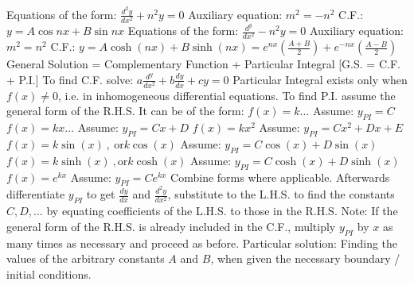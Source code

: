 \documentclass[12pt]{article}
\begin{document}
\begin{flushleft}
	\textbullet \quad Equations of the form: $\displaystyle \frac{d^2y}{dx^2} +n^2y = 0$ \linebreak 
	Auxiliary equation: $m^2=-n^2$ \linebreak 
	C.F.: $y=A\cos nx + B\sin nx$ \linebreak 
	\textbullet \quad Equations of the form: $\frac{d^y}{dx^2} -n^2y = 0$ \linebreak 
	Auxiliary equation: $m^2 =n^2$ \linebreak 
	C.F.: $\displaystyle y=A \cosh (nx) + B \sinh (nx) = e^{nx} \left( \frac{A+B}{2} \right) +e^{-nx} \left( \frac{A-B}{2} \right)$ \linebreak 
	\textbullet \quad General Solution = Complementary Function + Particular Integral [G.S. = C.F. + P.I.] \linebreak 
	\textbullet \quad To find C.F. solve: $\displaystyle a\frac{d^y}{dx^2} +b\frac{dy}{dx} +cy = 0$ \linebreak 
	\textbullet \quad Particular Integral exists only when $f(x) \neq 0$, i.e. in inhomogeneous differential equations. \linebreak 
	\textbullet \quad To find P.I. assume the general form of the R.H.S. It can be of the form: \linebreak 
	$f(x) = k \ldots$ \qquad Assume: $y_{PI} = C$ \linebreak 
	$f(x) = kx \ldots$ \qquad Assume: $y_{PI} =Cx + D$ \linebreak 
	$f(x) = kx^2$ \qquad Assume: $y_{PI} = Cx^2 +Dx +E$ \linebreak 
	$\displaystyle f(x) = k\sin (x)\ , \ \text{or} k\cos (x)$ Assume: $\displaystyle y_{PI} = C \cos (x) + D\sin (x) $ \linebreak 
	$\displaystyle f(x) = k \sinh (x) \ , \text{or} k \cosh (x)$ Assume: $\displaystyle y_{PI} = C \cosh (x) + D\sinh (x)$ \linebreak 
	$f(x) = e^{kx} $ \qquad Assume: $y_{PI} = Ce^{kx} $ \linebreak 
	Combine forms where applicable. Afterwards differentiate $y_{PI}$ to get $\frac{dy}{dx}$ and $\frac{d^2y}{dx^2}$, substitute to the L.H.S. to find the constants $C, D, \ldots$ by equating coefficients of the L.H.S. to those in the R.H.S. \linebreak 
	\textbullet \quad Note: If the general form of the R.H.S. is already included in the C.F., multiply $y_{PI}$ by $x$ as many times as necessary and proceed as before. \linebreak 
	\textbullet \quad Particular solution: Finding the values of the arbitrary constants $A$ and $B$, when given the necessary boundary / initial conditions. \linebreak 
	

\end{flushleft}
\end{document}
